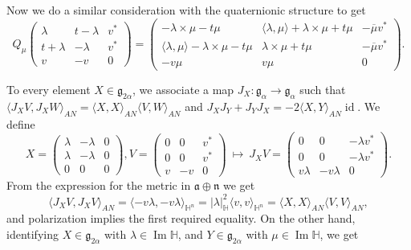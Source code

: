 \documentclass[12pt, a4paper]{amsart}
\newcommand{\id}{\operatorname{id}}
\newcommand{\g}{\mathfrak}
\renewcommand{\H}{\mathbb{H}}
\renewcommand{\Im}{\operatorname{Im}}
\theoremstyle{remark}
\begin{document}
Now we do a similar consideration with the quaternionic structure to get 
\[
Q_{\mu}\left(
\begin{array}{cc|c}
	\lambda & t-\lambda & v^{*} \\
	t+\lambda & -\lambda & v^{*} \\
	\hline
	v & -v & 0
\end{array}
\right)
=\left(
\begin{array}{cc|c}
-\lambda\times\mu-t\mu & \langle\lambda,\mu\rangle+\lambda\times\mu+t\mu & -\overline{\mu}v^{*} \\
\langle\lambda,\mu\rangle-\lambda\times\mu-t\mu & \lambda\times\mu+t\mu & -\overline{\mu}v^{*} \\
\hline
-v\mu & v\mu & 0
\end{array}
\right).
\]

To every element $X\in\g{g}_{2\alpha}$, we associate a map $J_{X}\colon\g{g}_{\alpha}\to\g{g}_{\alpha}$ such that 
$\langle J_X V,J_X W\rangle_{AN}=\langle X,X\rangle_{AN} \langle V,W\rangle_{AN}$ and 
$J_X J_Y+J_Y J_X=-2\langle X,Y\rangle_{AN}\id$.
We define
\begin{equation*}
X=\left(
\begin{array}{cc|c}
	\lambda & -\lambda & 0 \\
	\lambda & -\lambda & 0 \\
	\hline
	0 & 0 & 0
\end{array}
\right),
V=\left(
	\begin{array}{cc|c}
		0 & 0 & v^{*} \\
		0 & 0 & v^{*} \\
		\hline
		v & -v & 0
	\end{array}
\right)\ 
\mapsto\
J_{X}V=\left(
	\begin{array}{cc|c}
		0 & 0 & -\lambda v^{*} \\
		0 & 0 & -\lambda v^{*} \\
		\hline
		v\lambda & -v\lambda & 0
	\end{array}
\right).
\end{equation*}
From the expression for the metric in $\g{a}\oplus\g{n}$ we get
\[
\langle J_X V,J_X V\rangle_{AN}
=\langle -v\lambda,-v\lambda\rangle_{\H^n}
=\lvert\lambda\rvert_{\H}^2\langle v, v\rangle_{\H^n}
=\langle X,X\rangle_{AN}\langle V, V\rangle_{AN},
\]	
and polarization implies the first required equality.
On the other hand, identifying $X\in\g{g}_{2\alpha}$ with $\lambda\in\Im\H$, and $Y\in\g{g}_{2\alpha}$ with $\mu\in\Im\H$, we get
\end{document}
